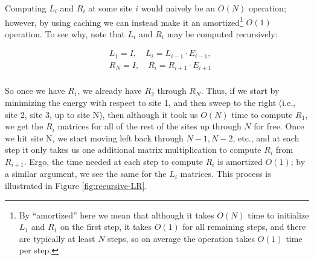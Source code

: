 \documentclass[12pt]{amsbook}
\theoremstyle{plain}
\theoremstyle{definition}
\theoremstyle{remark}
\begin{document}
Computing $L_i$ and $R_i$ at some site $i$ would naively be an $O(N)$ operation; however, by using caching we can instead make it an amortized\footnote{By ``amortized'' here we mean that although it takes $O(N)$ time to initialize $L_1$ and $R_1$ on the first step, it takes $O(1)$ for all remaining steps, and there are typically at least $N$ steps, so on average the operation takes $O(1)$ time per step.} $O(1)$ operation.  To see why, note that $L_i$ and $R_i$ may be computed recursively:

$$
\begin{aligned}
&L_1 = I,\quad L_{i} = L_{i-1}\cdot E_{i-1},\\
&R_N = I,\quad R_i = R_{i+1}\cdot E_{i+1} \\
\end{aligned}
$$

So once we have $R_1$, we already have $R_2$ through $R_N$.  Thus, if we start by minimizing the energy with respect to site 1, and then sweep to the right (i.e., site 2, site 3, up to site N), then although it took us $O(N)$ time to compute $R_1$, we get the $R_i$ matrices for all of the rest of the sites up through $N$ for free.  Once we hit site N, we start moving left back through $N-1,N-2$, etc., and at each step it only takes us one additional matrix multiplication to compute $R_i$ from $R_{i+1}$.  Ergo, the time needed at each step to compute $R_i$ is amortized $O(1)$;  by a similar argument, we see the same for the $L_i$ matrices.  This process is illustrated in Figure \ref{fig:recursive-LR}.
\end{document}
